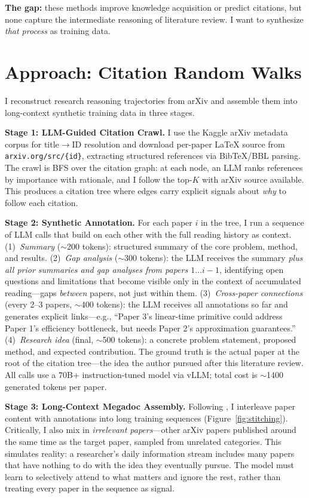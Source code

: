\documentclass[10pt]{article}
\begin{document}
\textbf{The gap:} these methods improve knowledge acquisition or predict citations, but none capture the intermediate reasoning of literature review. I want to synthesize \textit{that process} as training data.

\section{Approach: Citation Random Walks}

I reconstruct research reasoning trajectories from arXiv and assemble them into long-context synthetic training data in three stages.

\textbf{Stage 1: LLM-Guided Citation Crawl.}
I use the Kaggle arXiv metadata corpus for title$\to$ID resolution and download per-paper LaTeX source from \texttt{arxiv.org/src/\{id\}}, extracting structured references via BibTeX/BBL parsing. The crawl is BFS over the citation graph: at each node, an LLM ranks references by importance with rationale, and I follow the top-$K$ with arXiv source available. This produces a citation tree where edges carry explicit signals about \textit{why} to follow each citation.

\textbf{Stage 2: Synthetic Annotation.}
For each paper $i$ in the tree, I run a sequence of LLM calls that build on each other with the full reading history as context. (1)~\textit{Summary} ($\sim$200 tokens): structured summary of the core problem, method, and results. (2)~\textit{Gap analysis} ($\sim$300 tokens): the LLM receives the summary \textit{plus all prior summaries and gap analyses from papers $1 \ldots i{-}1$}, identifying open questions and limitations that become visible only in the context of accumulated reading---gaps \textit{between} papers, not just within them. (3)~\textit{Cross-paper connections} (every 2--3 papers, $\sim$400 tokens): the LLM receives all annotations so far and generates explicit links---e.g., ``Paper 3's linear-time primitive could address Paper 1's efficiency bottleneck, but needs Paper 2's approximation guarantees.'' (4)~\textit{Research idea} (final, $\sim$500 tokens): a concrete problem statement, proposed method, and expected contribution. The ground truth is the actual paper at the root of the citation tree---the idea the author pursued after this literature review. All calls use a 70B+ instruction-tuned model via vLLM; total cost is $\sim$1400 generated tokens per paper.

\textbf{Stage 3: Long-Context Megadoc Assembly.}
Following \textcite{kim2025megadocs}, I interleave paper content with annotations into long training sequences (Figure~\ref{fig:stitching}). Critically, I also mix in \textit{irrelevant papers}---other arXiv papers published around the same time as the target paper, sampled from unrelated categories. This simulates reality: a researcher's daily information stream includes many papers that have nothing to do with the idea they eventually pursue. The model must learn to selectively attend to what matters and ignore the rest, rather than treating every paper in the sequence as signal.
\end{document}
